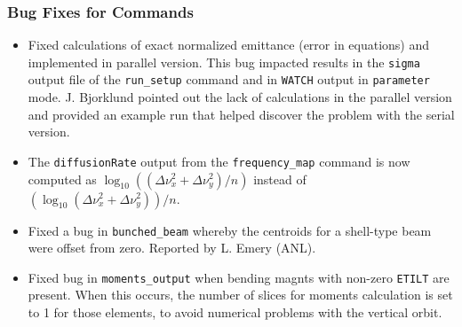 \documentclass[11pt]{article}
\begin{document}
\subsubsection{Bug Fixes for Commands}
\begin{itemize}
\item Fixed calculations of exact normalized emittance (error in equations) and implemented in parallel version.
  This bug impacted results in the \verb|sigma| output file of the \verb|run_setup| command and in \verb|WATCH|
  output in \verb|parameter| mode. J. Bjorklund pointed out the lack of calculations in the parallel version and
  provided an example run that helped discover the problem with the serial version. 
\item The \verb|diffusionRate| output from the \verb|frequency_map| command is now computed as 
$\log_{10} ((\Delta\nu_x^2+\Delta\nu_y^2)/n)$ instead of $(\log_{10} (\Delta\nu_x^2+\Delta\nu_y^2))/n$.
\item Fixed a bug in \verb|bunched_beam| whereby the centroids for a shell-type beam were offset from zero.
  Reported by L. Emery (ANL).
\item Fixed bug in \verb|moments_output| when bending magnts with non-zero \verb|ETILT| are present. When this occurs,
the number of slices for moments calculation is set to 1 for those elements, to avoid numerical problems with the
vertical orbit.
\end{itemize}
\end{document}
